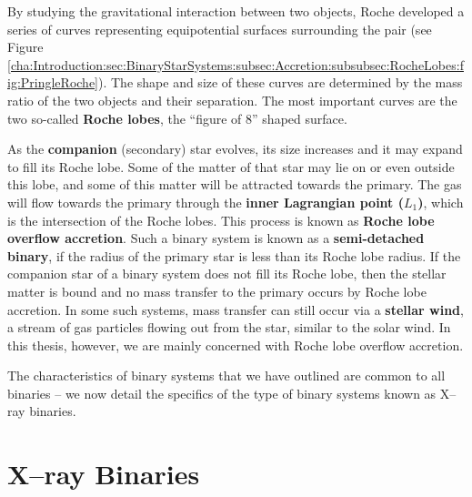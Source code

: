 By studying the gravitational interaction between two objects, Roche
developed a series of curves representing equipotential surfaces
surrounding the pair (see Figure~%
\vref{cha:Introduction:sec:BinaryStarSystems:subsec:Accretion:subsubsec:RocheLobes:fig:PringleRoche}). The shape and size of these curves are determined by the mass ratio of
the two objects and their separation.  The most important curves are
the two so-called \textbf{Roche lobes}, the ``figure of 8'' shaped surface. %

\vspace{\myparskip}

As the \textbf{companion} (secondary) star evolves, %
its size increases and it may expand to fill its Roche lobe. Some of
the matter of that star may lie on or even outside this lobe, and some of this matter will
be attracted towards the primary. The gas will flow towards the
primary through the \textbf{inner Lagrangian point ($L_1$)}, %
which is the intersection of the Roche lobes. This process is known as
\textbf{Roche lobe overflow accretion}. %
Such a binary system is known as a \textbf{semi-detached binary}, if the radius of the primary star is less than its Roche lobe
radius. If the companion star of a binary system does not fill its
Roche lobe, then the stellar matter is bound and no mass transfer to
the primary occurs by Roche lobe accretion. In some such systems, mass
transfer can still occur via a
\textbf{stellar wind}, a stream of gas particles flowing out from the star, similar to the
solar wind. In this thesis, however, we are mainly concerned with
Roche lobe overflow accretion. %

\vspace{\myparskip}

The characteristics of binary systems that we have outlined are common to all binaries -- we now detail the specifics of the type of binary systems known as X--ray binaries. %


\section{X--ray Binaries}
\label{cha:Introduction:sec:X--rayBinaries}

